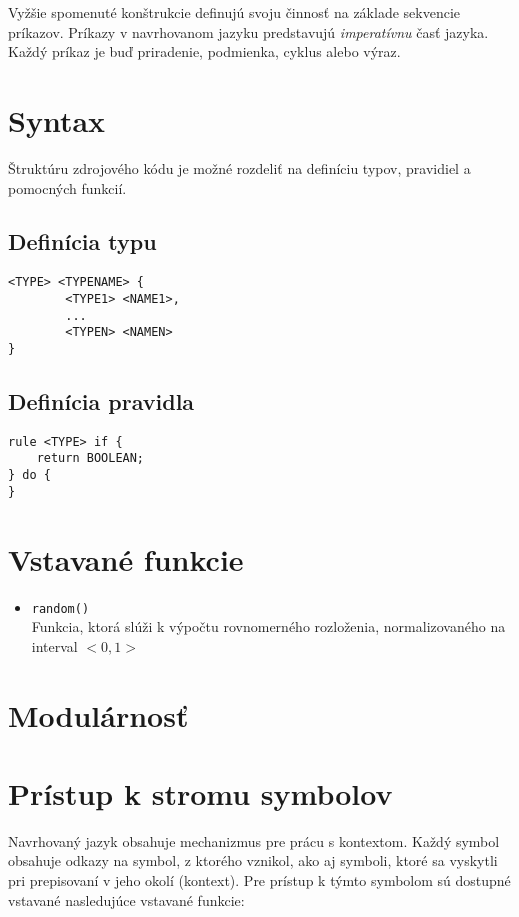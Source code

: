 Vyžšie spomenuté konštrukcie definujú svoju činnosť na základe sekvencie príkazov. Príkazy v navrhovanom jazyku predstavujú \textit{imperatívnu} časť jazyka.
Každý príkaz je buď priradenie, podmienka, cyklus alebo výraz.

\section{Syntax}

Štruktúru zdrojového kódu je možné rozdeliť na definíciu typov, pravidiel a pomocných funkcií.

\subsection{Definícia typu}

\begin{verbatim}
<TYPE> <TYPENAME> { 
        <TYPE1> <NAME1>,	
        ...
        <TYPEN> <NAMEN>	
}
\end{verbatim}

\subsection{Definícia pravidla}

\begin{verbatim}
rule <TYPE> if { 
	return BOOLEAN;
} do {
}
\end{verbatim}

\section{Vstavané funkcie}

\begin{itemize}
\item \texttt{random()} \\
	Funkcia, ktorá slúži k výpočtu rovnomerného rozloženia, normalizovaného na interval $<0,1>$
\end{itemize}
\section{Modulárnosť}
\section{Prístup k stromu symbolov}

Navrhovaný jazyk obsahuje mechanizmus pre prácu s kontextom. Každý symbol obsahuje odkazy na symbol, z ktorého vznikol, ako aj symboli, ktoré sa vyskytli
pri prepisovaní v jeho okolí (kontext). Pre prístup k týmto symbolom sú dostupné vstavané nasledujúce vstavané funkcie:

